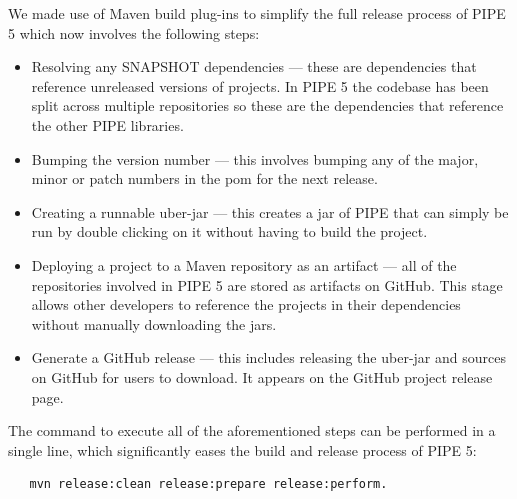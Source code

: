 We made use of Maven build plug-ins to simplify the full release process of PIPE 5 which now involves the following steps:
\begin{itemize} 
    \item Resolving any SNAPSHOT dependencies --- these are dependencies that reference unreleased versions of projects. In PIPE 5 the codebase has been split across multiple repositories so these are the dependencies that reference the other PIPE libraries.
    \item Bumping the version number --- this involves bumping any of the major, minor or patch numbers in the pom for the next release.
    \item Creating a runnable uber-jar --- this creates a jar of PIPE that can simply be run by double clicking on it without having to build the project.
    \item Deploying a project to a Maven repository as an artifact --- all of the repositories involved in PIPE 5 are stored as artifacts on GitHub. This stage allows other developers to reference the projects in their dependencies without manually downloading the jars.
    \item Generate a GitHub release --- this includes releasing the uber-jar and sources on GitHub for users to download. It appears on the GitHub project release page.
\end{itemize}
The command to execute all of the aforementioned steps can be performed in a single line, which significantly eases the build and release process of PIPE 5:
\begin{lstlisting}
   mvn release:clean release:prepare release:perform.
\end{lstlisting}